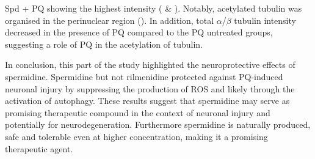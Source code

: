 Spd + PQ showing the highest intensity ( \& ). Notably, acetylated tubulin was organised in the perinuclear region (). In addition, total $\alpha$/$\beta$ tubulin intensity decreased in the presence of PQ compared to the PQ untreated groups, suggesting a role of PQ in the acetylation of tubulin.

In conclusion, this part of the study highlighted the neuroprotective effects of spermidine. Spermidine but not rilmenidine protected against PQ-induced neuronal injury by suppressing the production of ROS and likely through the activation of autophagy. These results suggest that spermidine may serve as promising therapeutic compound  in the context of neuronal injury and potentially for neurodegeneration. Furthermore spermidine is naturally produced, safe and tolerable even at higher concentration, making it a promising therapeutic agent.

























 





